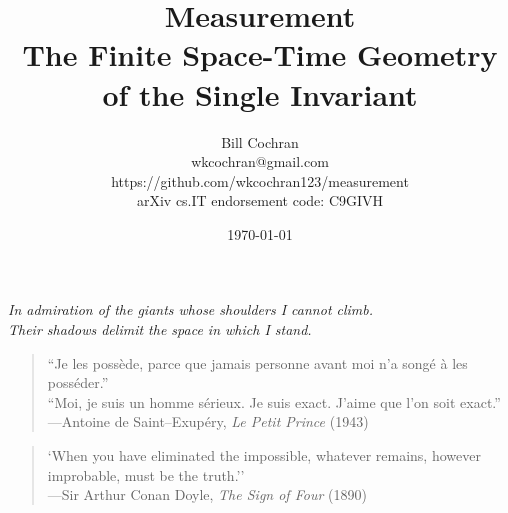 \documentclass[12pt,oneside]{book}
\begin{document}
\title{Measurement\\
\large The Finite Space-Time Geometry \\
of the Single Invariant}

\author{Bill Cochran\\wkcochran@gmail.com\\https://github.com/wkcochran123/measurement\\arXiv cs.IT endorsement code: C9GIVH}
\date{\today}



\maketitle

\begin{center}
\vspace*{2em}
\begin{center}
\vspace*{2em}
\vspace*{2em}
\textit{In admiration of the giants whose shoulders I cannot climb. \\
Their shadows delimit the space in which I stand.}
\vspace*{6em}
\begin{quote}
``Je les possède, parce que jamais personne avant moi n’a songé à les posséder.''\\
``Moi, je suis un homme sérieux. Je suis exact. J’aime que l’on soit exact.''\\
\hfill---Antoine de Saint--Exup\'ery, \textit{Le Petit Prince} (1943)
\end{quote}
\vspace*{2em}
\begin{quote}
`When you have eliminated the impossible, whatever remains, however improbable, must be the truth.'' \\
\hfill---Sir Arthur Conan Doyle, \textit{The Sign of Four} (1890)
\end{quote}
\end{center}

\vspace*{2em}
\end{center}
\end{document}
